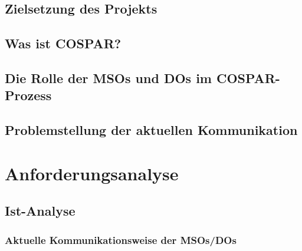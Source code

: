 \documentclass[11pt,a4paper]{article}
\begin{document}
\subsection{Zielsetzung des Projekts}

\subsection{Was ist COSPAR?}

\subsection{Die Rolle der MSOs und DOs im COSPAR-Prozess}

\subsection{Problemstellung der aktuellen Kommunikation}

\newpage

\section{Anforderungsanalyse}

\subsection{Ist-Analyse}

\subsubsection{Aktuelle Kommunikationsweise der MSOs/DOs}
\end{document}
